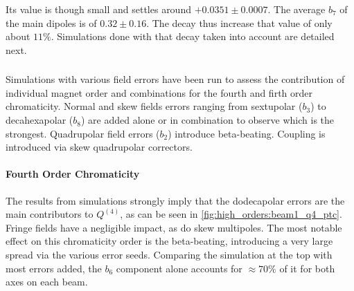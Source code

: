 Its value is though small and settles around $+0.0351 \pm 0.0007$. The average $b_7$ of the main
dipoles is of $0.32 \pm 0.16$. The decay thus increase that value of only about $11\%$.
Simulations done with that decay taken into account are detailed next.


\subsubsection{}

Simulations with various field errors have been run to assess the contribution of individual magnet
order and combinations for the fourth and firth order chromaticity. Normal and skew fields errors
ranging from sextupolar ($b_3$) to decahexapolar ($b_8$) are added alone or in combination to
observe which is the strongest. Quadrupolar field errors ($b_2$) introduce beta-beating. Coupling is
introduced via skew quadrupolar correctors.


\paragraph{Fourth Order Chromaticity}

The results from simulations strongly imply that the dodecapolar errors are the main contributors
to $Q^{(4)}$, as can be seen in \cref{fig:high_orders:beam1_q4_ptc}.
Fringe fields have a negligible impact, as do skew multipoles.
The most notable effect on this chromaticity order is the beta-beating, introducing a very large
spread via the various error seeds.
Comparing the simulation at the top with most errors added, the $b_6$ component alone accounts for
$\approx 70\%$ of it for both axes on each beam.

